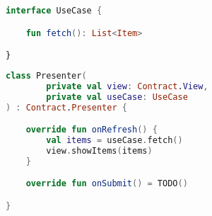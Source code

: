 \documentclass[10pt]{beamer}
\begin{document}
\begin{frame}[fragile]
\begin{lstlisting}[language=Kotlin, basicstyle=\ttfamily]
interface UseCase {

    fun fetch(): List<Item>

}
\end{lstlisting}
\end{frame}



\begin{frame}[fragile]
\begin{lstlisting}[language=Kotlin, basicstyle=\ttfamily]
class Presenter(
        private val view: Contract.View,
        private val useCase: UseCase
) : Contract.Presenter {

    override fun onRefresh() {
        val items = useCase.fetch()
        view.showItems(items)
    }

    override fun onSubmit() = TODO()

}
\end{lstlisting}
\end{frame}



\begin{frame}[fragile]
\begin{lstlisting}[language=Kotlin, basicstyle=\ttfamily]
\end{lstlisting}
\end{frame}


\begin{frame}[fragile]
\begin{lstlisting}[language=Kotlin, basicstyle=\ttfamily]
\end{lstlisting}
\end{frame}

\begin{frame}[fragile]
\begin{lstlisting}[language=Kotlin, basicstyle=\ttfamily]
\end{lstlisting}
\end{frame}

\begin{frame}[fragile]
\begin{lstlisting}[language=Kotlin, basicstyle=\ttfamily]
\end{lstlisting}
\end{frame}


\begin{frame}[fragile]
\begin{lstlisting}[language=Kotlin, basicstyle=\ttfamily]
\end{lstlisting}
\end{frame}









\end{document}
